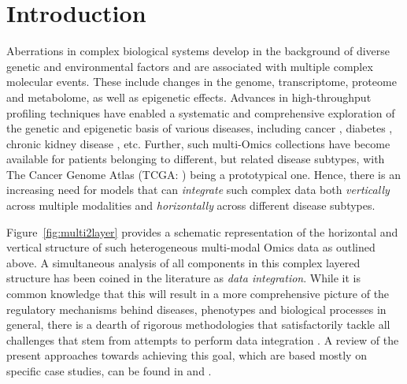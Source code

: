 \section{Introduction}

Aberrations in complex biological systems develop in the background of diverse genetic and environmental factors and are associated with multiple complex molecular events. These include changes in the genome, transcriptome, proteome and metabolome, as well as epigenetic effects. Advances in high-throughput profiling techniques have enabled a systematic and comprehensive exploration of the genetic and epigenetic basis of various diseases, including cancer \citep{lee2016integrated, kaushik2016inhibition}, diabetes \citep{yuan2014integrated,sas2018shared}, chronic kidney disease \citep{atzler2014integrated}, etc. Further, such multi-Omics collections have become available for patients belonging to different, but related disease subtypes, with The Cancer Genome Atlas (TCGA: \cite{Tomczak15}) being a prototypical one. Hence, there is an increasing need for models that can {\em integrate} such complex data both {\em vertically} across multiple modalities and {\em horizontally} across different disease subtypes.

Figure~\ref{fig:multi2layer} provides a schematic representation of the horizontal and vertical structure of such heterogeneous multi-modal Omics data as outlined above. A simultaneous analysis of all components in this complex layered structure has been coined in the literature as {\it data integration}. While it is common knowledge that this will result in a more comprehensive picture of the regulatory mechanisms behind diseases, phenotypes and biological processes in general, there is a dearth of rigorous methodologies that satisfactorily tackle all challenges that stem from attempts to perform data integration \citep{GomezCabreroEtal14,JoycePalsson06,GligPrzulj15}. A review of the present approaches towards achieving this goal, which are based mostly on specific case studies, can be found in \cite{GligPrzulj15} and \cite{ZhangOuyangZhao17}.

